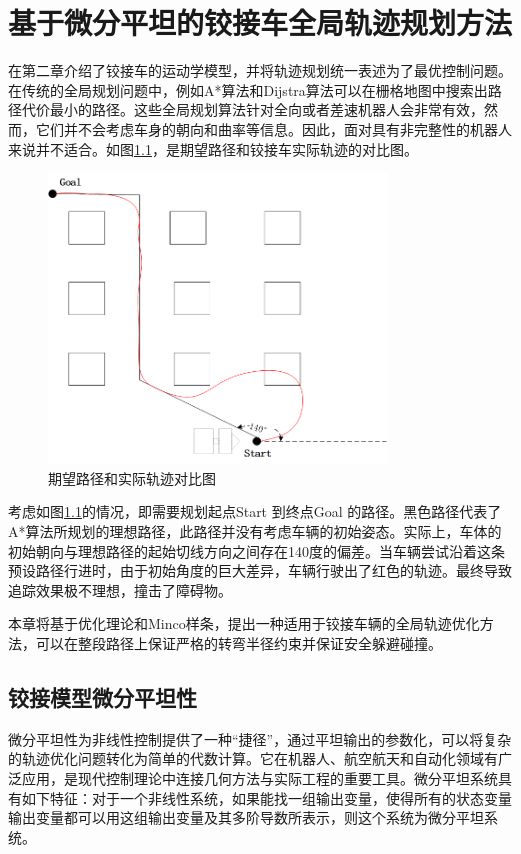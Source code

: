 \documentclass[master,academic]{ysuthesis} %
\begin{document}
	\chapter{基于微分平坦的铰接车全局轨迹规划方法}
		在第二章介绍了铰接车的运动学模型，并将轨迹规划统一表述为了最优控制问题。在传统的全局规划问题中，例如A*算法和Dijstra算法可以在栅格地图中搜索出路径代价最小的路径。这些全局规划算法针对全向或者差速机器人会非常有效，然而，它们并不会考虑车身的朝向和曲率等信息。因此，面对具有非完整性的机器人来说并不适合。如图\ref{fig:路径规划算法特例}，是期望路径和铰接车实际轨迹的对比图。
		\begin{figure}[H]
			\centering
			\includegraphics[width=0.8\textwidth]{路径规划算法特例.png}
			\caption{期望路径和实际轨迹对比图}
			\label{fig:路径规划算法特例}
		\end{figure}

		考虑如图\ref{fig:路径规划算法特例}的情况，即需要规划起点Start 到终点Goal 的路径。黑色路径代表了A*算法所规划的理想路径，此路径并没有考虑车辆的初始姿态。实际上，车体的初始朝向与理想路径的起始切线方向之间存在140度的偏差。当车辆尝试沿着这条预设路径行进时，由于初始角度的巨大差异，车辆行驶出了红色的轨迹。最终导致追踪效果极不理想，撞击了障碍物。
		
		本章将基于优化理论和Minco样条，提出一种适用于铰接车辆的全局轨迹优化方法，可以在整段路径上保证严格的转弯半径约束并保证安全躲避碰撞。
		
	\section{铰接模型微分平坦性}
		微分平坦性为非线性控制提供了一种“捷径”，通过平坦输出的参数化，可以将复杂的轨迹优化问题转化为简单的代数计算。它在机器人、航空航天和自动化领域有广泛应用，是现代控制理论中连接几何方法与实际工程的重要工具。微分平坦系统具有如下特征：对于一个非线性系统，如果能找一组输出变量，使得所有的状态变量输出变量都可以用这组输出变量及其多阶导数所表示，则这个系统为微分平坦系统。
\end{document}
